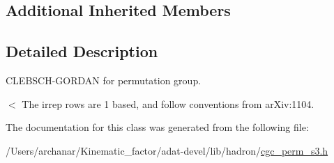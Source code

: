 \subsection*{Additional Inherited Members}


\subsection{Detailed Description}
C\+L\+E\+B\+S\+C\+H-\/\+G\+O\+R\+D\+AN for permutation group. 

$<$ The irrep rows are 1 based, and follow conventions from ar\+Xiv\+:1104. 

The documentation for this class was generated from the following file\+:\begin{DoxyCompactItemize}
\item 
/\+Users/archanar/\+Kinematic\+\_\+factor/adat-\/devel/lib/hadron/\mbox{\hyperlink{adat-devel_2lib_2hadron_2cgc__perm__s3_8h}{cgc\+\_\+perm\+\_\+s3.\+h}}\end{DoxyCompactItemize}
